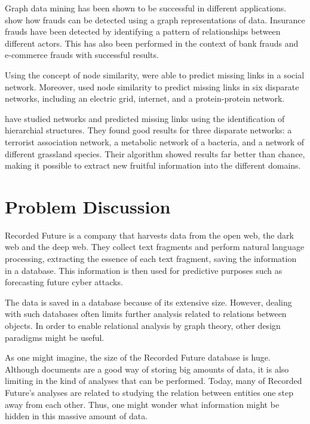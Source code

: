 Graph data mining has been shown to be successful in different applications. \citet{bankFraud} show how frauds can be detected using a graph representations of data. Insurance frauds have been detected by identifying a pattern of relationships between different actors. This has also been performed in the context of bank frauds and e-commerce frauds with successful results. 

Using the concept of node similarity, \citet{Liben-Nowell2003} were able to predict missing links in a social network. Moreover, \citet{Zhou2009} used node similarity to predict missing links in six disparate networks, including an electric grid, internet, and a protein-protein network.

\citet{clauset2008Hierarchicalstructure} have studied networks and predicted missing links using the identification of hierarchial structures. They found good results for three disparate networks: a terrorist association network, a metabolic network of a bacteria, and a network of different grassland species. Their algorithm showed results far better than chance, making it possible to extract new fruitful information into the different domains. 

\section{Problem Discussion}
Recorded Future is a company that harvests data from the open web, the dark web and the deep web. They collect text fragments and perform natural language processing, extracting the essence of each text fragment, saving the information in a database. This information is then used for predictive purposes such as forecasting future cyber attacks.

The data is saved in a database because of its extensive size. However, dealing with such databases often limits further analysis related to relations between objects. In order to enable relational analysis by graph theory, other design paradigms might be useful.

As one might imagine, the size of the Recorded Future database is huge. Although documents are a good way of storing big amounts of data, it is also limiting in the kind of analyses that can be performed. Today, many of Recorded Future's analyses are related to studying the relation between entities one step away from each other. Thus, one might wonder what information might be hidden in this massive amount of data.

